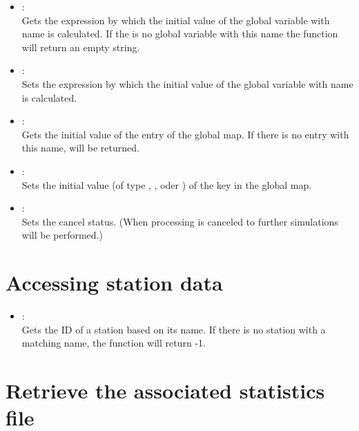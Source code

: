 \begin{itemize}
\item
{}:\\
Gets the expression by which the initial value of the global variable with
name  is calculated. If the is no global variable with
this name the function will return an empty string.

\item
{}:\\
Sets the expression by which the initial value of the global variable with
name  is calculated.

\item
{}:\\
Gets the initial value of the entry  of the global map.
If there is no entry with this name,  will be returned.

\item
{}:\\
Sets the initial value (of type , ,  oder ) of the key 
in the global map.

\item
{}:\\
Sets the cancel status. (When processing is canceled to further simulations will be performed.)

\end{itemize}

\section{Accessing station data}

\begin{itemize}

\item
{}:\\
Gets the ID of a station based on its name.
If there is no station with a matching name, the function will return -1.

\end{itemize}

\section{Retrieve the associated statistics file}

